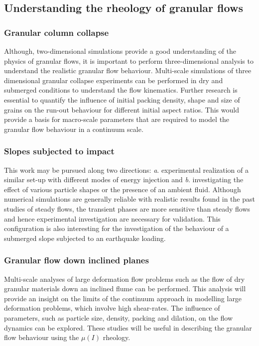\subsection{Understanding the rheology of granular flows}

\subsubsection*{Granular column collapse}
Although, two-dimensional simulations provide a good understanding of the 
physics of granular flows, it is important to perform three-dimensional 
analysis to understand the realistic granular flow behaviour. Multi-scale 
simulations of three dimensional granular collapse experiments can be performed 
in dry and submerged conditions to understand the flow kinematics. Further 
research is essential to quantify the influence of initial packing density, 
shape and size of grains on the run-out behaviour for different initial aspect 
ratios. This would provide a basis for macro-scale parameters that are required 
to model the granular flow behaviour in a continuum scale.

\subsubsection*{Slopes subjected to impact}
This work may be pursued along two directions: \textit{a}. experimental 
realization of a similar set-up with different modes of energy injection and 
\textit{b}. investigating the effect of various particle shapes or the presence 
of an ambient fluid. Although numerical simulations are generally reliable with 
realistic results found in the past studies of steady flows, the transient 
phases are more sensitive than steady flows and hence experimental 
investigation are necessary for validation. This configuration is also 
interesting for the investigation of the behaviour of a submerged slope 
subjected to an earthquake loading.

\subsubsection*{Granular flow down inclined planes}

Multi-scale analyses of large deformation flow problems such as the flow of dry 
granular materials down an inclined flume can be performed. This analysis will 
provide an insight on the limits of the continuum approach in modelling large 
deformation problems, which involve high shear-rates. The influence of 
parameters, such as particle size, density, packing and dilation, on the flow 
dynamics can be explored. These studies will be useful in describing the 
granular flow behaviour using the $\mu(I)$ rheology.

